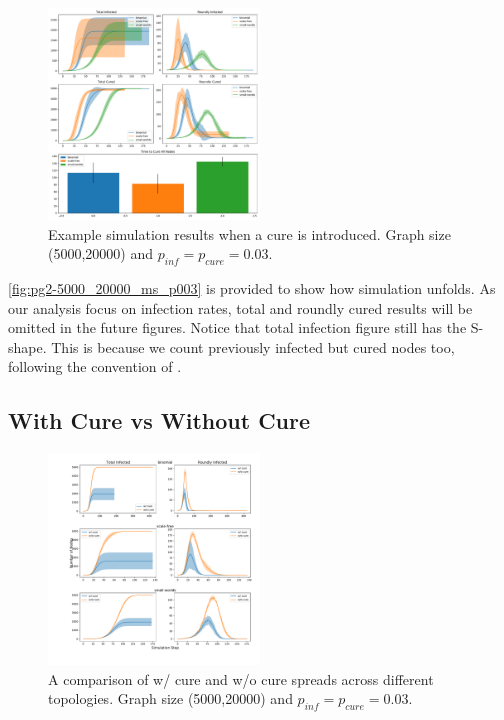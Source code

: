 \documentclass[conference]{IEEEtran}
\begin{document}
\begin{figure}[htb]
  \begin{center}
	\includegraphics[width=0.5\textwidth]{img/pg2-5000_20000_ms_p003.pdf}
  \end{center}
	\caption{Example simulation results when a cure is introduced. Graph size (5000,20000) and $p_{inf} = p_{cure} = 0.03$.}
	\label{fig:pg2-5000_20000_ms_p003}
\end{figure}

\autoref{fig:pg2-5000_20000_ms_p003} is provided to show how simulation unfolds. As our analysis focus on infection rates, total and roundly cured results will be omitted in the future figures.
Notice that total infection figure still has the S-shape. This is because we count previously infected but cured nodes too, following the convention of \cite{redcode}.

\subsection{With Cure vs Without Cure}\label{sec:one2one-cure}

\begin{figure}[htb]
  \begin{center}
	\includegraphics[width=0.5\textwidth]{img/pg2-one2one-5000_20000_ms_p003.pdf}
  \end{center}
	\caption{A comparison of w/ cure and w/o cure spreads across different topologies. Graph size (5000,20000) and $p_{inf} = p_{cure} = 0.03$.}
	\label{fig:pg2-one2one-5000_20000_ms_p003}
\end{figure}
\end{document}
